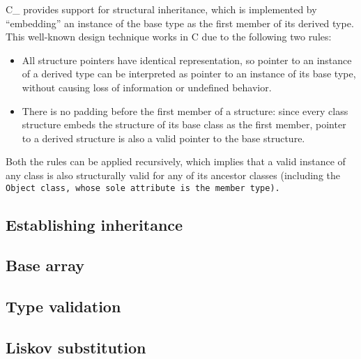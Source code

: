 \def\Subsection#1{\subsection{#1}}

C\_ provides support for structural inheritance, which is implemented by
``embedding'' an instance of the base type as the first member of its derived type.
This well-known design technique works in C due to the following two rules:

\begin{itemize}[nosep]

\item All structure pointers have identical representation, so pointer to an
instance of a derived type can be interpreted as pointer to an instance of
its base type, without causing loss of information or undefined behavior.

\item There is no padding before the first member of a structure: since every
class structure embeds the structure of its base class as the first member,
pointer to a derived structure is also a valid pointer to the base structure.

\end{itemize}

Both the rules can be applied recursively, which implies that a valid instance
of any class is also structurally valid for any of its ancestor classes
(including the \tt{Object} class, whose sole attribute is the member \tt{type}).

\Subsection{Establishing inheritance}

\Subsection{Base array}

\Subsection{Type validation}

\Subsection{Liskov substitution}
